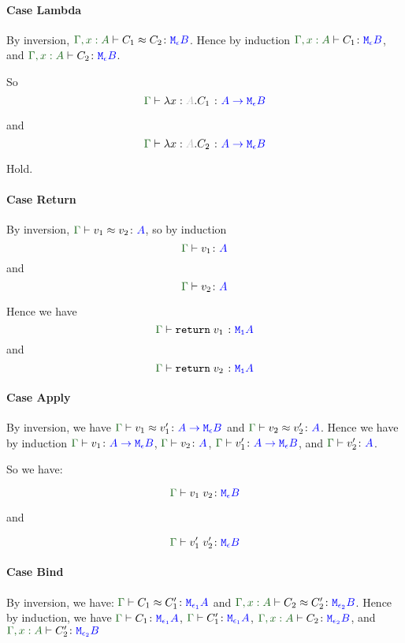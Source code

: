 {\paragraph{Case Lambda}
    By inversion, $\berelation{\gax}{C_1}{C_2}{\meb}$. Hence by induction $\typerelation{\gax}{C_1}{\meb}$, and $\typerelation{\gax}{C_2}{\meb}$.

    So 
    \begin{equation}
        \gtyperelation{\lam{x}{A}{C_1}}{\aeb}
    \end{equation}

    and
    \begin{equation}
        \gtyperelation{\lam{x}{A}{C_2}}{\aeb}
    \end{equation}

    Hold.
\paragraph{Case Return}
    By inversion, $\gberelation{v_1}{v_2}{A}$, so by induction $$\gtyperelation{v_1}{A}$$ and $$\gtyperelation{v_2}{A}$$

    Hence we have $$\gtyperelation{\return{v_1}}{\moa}$$
    and
    $$\gtyperelation{\return{v_2}}{\moa}$$
\paragraph{Case Apply}

    By inversion, we have $\gberelation{v_1}{v_1'}{\aeb}$ and $\gberelation{v_2}{v_2'}{A}$. Hence we have by induction $\gtyperelation{v_1}{\aeb}$, $\gtyperelation{v_2}{A}$, $\gtyperelation{v_1'}{\aeb}$, and $\gtyperelation{v_2'}{A}$.

    So we have:

    \begin{equation}
        \gtyperelation{\apply{v_1}{v_2}}{\meb}
    \end{equation}

    and

    
    \begin{equation}
        \gtyperelation{\apply{v_1'}{v_2'}}{\meb}
    \end{equation}

\paragraph{Case Bind}
    By inversion, we have:
    $\gberelation{C_1}{C_1'}{\M{\e_1}{A}}$ and
    $\berelation{\gax}{C_2}{C_2'}{\M{\e_2}{B}}$.
    Hence by induction, we have 
    $\gtyperelation{C_1}{\M{\e_1}{A}}$,
    $\gtyperelation{C_1'}{\M{\e_1}{A}}$,
    $\typerelation{\gax}{C_2}{\M{\e_2}{B}}$, and 
    $\typerelation{\gax}{C_2'}{\M{\e_2}{B}}$

}
